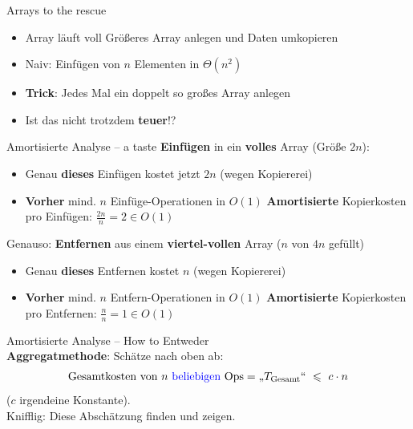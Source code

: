 \begin{frame}{Arrays to the rescue}
	\begin{itemize}
		\item Array läuft voll \impl Größeres Array anlegen und Daten umkopieren
		\pause
		\item Naiv: Einfügen von $n$ Elementen in $\Theta(n^2)$
		\pause
		\item \textbf{Trick}: Jedes Mal ein doppelt so großes Array anlegen
		\item Ist das nicht trotzdem \textbf{teuer}!?
	\end{itemize}
\end{frame}

\begin{frame}{Amortisierte Analyse – a taste}
	\textbf{Einfügen} in ein \textbf{volles} Array (Größe $2n$):
	\begin{itemize}
		\implitem Array muss vergrößert (also umkopiert werden)
		\pause
		\item Genau \textbf{dieses} Einfügen kostet jetzt $2n$ (wegen Kopiererei)
		\pause
		\item \textbf{Vorher} mind. $n$ Einfüge-Operationen  in $O(1)$
		\pause
		\implitem \textbf{Amortisierte} Kopierkosten pro Einfügen: $\frac{2n}{n} = 2 \in O(1)$
	\end{itemize} \pause
	\forcenewline
	Genauso: \textbf{Entfernen} aus einem \textbf{viertel-vollen} Array ($n$ von $4n$ gefüllt)
	\begin{itemize} 
		\implitem Array muss verkleinert ($=$ umkopiert) werden
		\pause
		\item Genau \textbf{dieses} Entfernen kostet $n$ (wegen Kopiererei)
		\pause
		\item \textbf{Vorher} mind. $n$ Entfern-Operationen  in $O(1)$
		\pause
		\implitem \textbf{Amortisierte} Kopierkosten pro Entfernen: $\frac{n}{n} = 1 \in O(1)$
	\end{itemize}
\end{frame}

\begin{frame}{Amortisierte Analyse – How to}
	Entweder \\
	\textbf{Aggregatmethode}: Schätze nach oben ab:
	\[
		\text{Gesamtkosten von $n$ \textcolor{blue}{beliebigen} Ops} = \text{„}T_\text{Gesamt}\text{“} \ \leq \ c \cdot n 
	\]
	($c$ irgendeine Konstante). \\ \forcenewline
	Knifflig: Diese Abschätzung finden und zeigen.
\end{frame}

